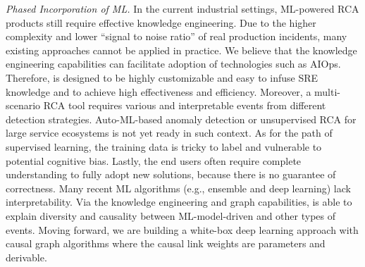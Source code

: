 \emph{Phased Incorporation of ML.} In the current industrial settings, ML-powered RCA products still require effective knowledge engineering. Due to the higher complexity and lower ``signal to noise ratio'' of real production incidents, many existing approaches cannot be applied in practice. We believe that the knowledge engineering capabilities can facilitate adoption of technologies such as AIOps. Therefore, \system is designed to be highly customizable and easy to infuse SRE knowledge and to achieve high effectiveness and efficiency. Moreover, a multi-scenario RCA tool requires various and interpretable events from different detection strategies. Auto-ML-based anomaly detection or unsupervised RCA for large service ecosystems is not yet ready in such context.
As for the path of supervised learning, the training data is tricky to label and vulnerable to potential cognitive bias. 
Lastly, the end users often require complete understanding to fully adopt new solutions, because there is no guarantee of correctness. Many recent ML algorithms (e.g., ensemble and deep learning) lack interpretability. Via the knowledge engineering and graph capabilities, \system is able to explain diversity and causality between ML-model-driven and other types of events. Moving forward, we are building a white-box deep learning approach with causal graph algorithms where the causal link weights are parameters and derivable. 
